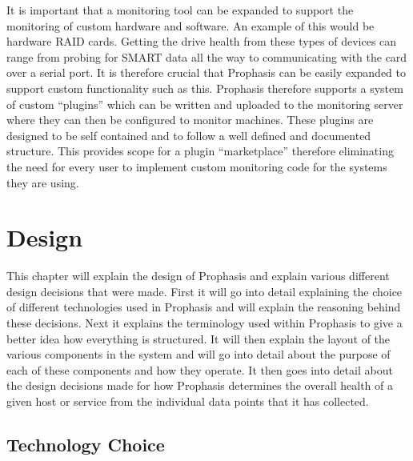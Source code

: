 \documentclass[bsc,deptreport,twoside,parskip,singlespacing,notimes]{infthesis}
\begin{document}
	It is important that a monitoring tool can be expanded to support the
	monitoring of custom hardware and software.  An example of this would be
	hardware RAID cards.  Getting the drive health from these types of devices can
	range from probing for SMART data all the way to communicating with the card
	over a serial port.  It is therefore crucial that Prophasis can be easily
	expanded to support custom functionality such as this. Prophasis therefore
	supports a system of custom ``plugins'' which can be written and uploaded to the
	monitoring server where they can then be configured to monitor machines. These
	plugins are designed to be self contained and to follow a well defined and
	documented structure.  This provides scope for a plugin ``marketplace'' therefore
	eliminating the need for every user to implement custom monitoring code for the
	systems they are using.


\chapter{Design}
	This chapter will explain the design of Prophasis and explain various different
	design decisions that were made.  First it will go into detail explaining
	the choice of different technologies used in Prophasis and will explain the
	reasoning behind these decisions.  Next it explains the terminology used within
	Prophasis to give a better idea how everything is structured. It will then
	explain the layout of the various components in the system and will go into
	detail about the purpose of each of these components and how they operate.
	It then goes into detail about the design decisions made for how Prophasis
	determines the overall health of a given host or service from the individual
	data points that it has collected.

\section{Technology Choice}
\end{document}
